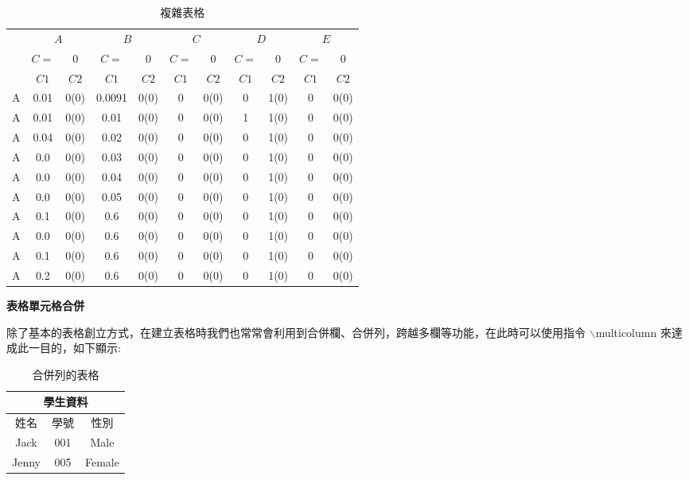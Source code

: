 \begin{table}[h]
\scriptsize
\setlength{\belowcaptionskip}{0pt}
\setlength{\belowcaptionskip}{0pt}
\centering
\caption{複雜表格}\label{tb:complicated_exam}
\begin{tabular}{ccccccccccc}
\toprule
\multirow{1}{*}{} &\multicolumn{2}{c}{$A$} &\multicolumn{2}{c}{$B$} &\multicolumn{2}{c}{$C$} &\multicolumn{2}{c}{$D$} &\multicolumn{2}{c}{$E$}\\
\cline{2-11}
   & $C=$ & 0 & $C=$ & 0 & $C=$ & 0 & $C=$ & 0 & $C=$ & 0 \\
\cmidrule(r){2-3} \cmidrule(r){4-5} \cmidrule(r){6-7} \cmidrule(r){8-9} \cmidrule(r){10-11}
&  $C1$      &  $C2$  
&  $C1$      &  $C2$   
&  $C1$      &  $C2$   
&  $C1$      &  $C2$   
&  $C1$      &  $C2$   \\
\midrule
A  & 0.01 & 0(0)  & 0.0091 & 0(0)  & 0 & 0(0)  & 0 & 1(0)  & 0     & 0(0) \\
    A  & 0.01 & 0(0)  & 0.01 & 0(0)  & 0 & 0(0)  & 1 & 1(0)  & 0     & 0(0) \\
    A  & 0.04& 0(0)  & 0.02 & 0(0)  & 0 & 0(0)  & 0 & 1(0)  & 0     & 0(0) \\
    A  & 0.0 & 0(0)  & 0.03 & 0(0)  & 0 & 0(0)  & 0 & 1(0)  & 0     & 0(0) \\
    A  & 0.0 & 0(0)  & 0.04 & 0(0)  & 0 & 0(0)  & 0 & 1(0)  & 0     & 0(0) \\
    A  & 0.0 & 0(0)  & 0.05 & 0(0)  & 0 & 0(0)  & 0 & 1(0)  & 0     & 0(0) \\
    A  & 0.1 & 0(0)  & 0.6 & 0(0)  & 0 & 0(0)  & 0 & 1(0)  & 0     & 0(0) \\
    A  & 0.0 & 0(0)  & 0.6 & 0(0)  & 0 & 0(0)  & 0 & 1(0)  & 0     & 0(0) \\
    A  & 0.1 & 0(0)  & 0.6 & 0(0)  & 0 & 0(0)  & 0 & 1(0)  & 0     & 0(0) \\
    A   & 0.2 & 0(0)  & 0.6 & 0(0)  & 0 & 0(0)  & 0 & 1(0)  & 0     & 0(0) \\
\bottomrule
\end{tabular}
\end{table}


\textbf{表格單元格合併}

除了基本的表格創立方式，在建立表格時我們也常常會利用到合併欄、合併列，跨越多欄等功能，在此時可以使用指令 {\A $\backslash$multicolumn} 來達成此一目的，如下顯示:


\begin{table}[h]
\centering
\extrarowheight=6pt
\caption{合併列的表格}\label{tb:combine}
\begin{tabular}{c|c|c}
\hline
\multicolumn{3}{c}{學生資料}\\
\hline
姓名 & 學號 & 性別\\
\hline
Jack & 001 & Male\\
\hline
Jenny & 005 & Female\\
\hline
\end{tabular}
\end{table}

